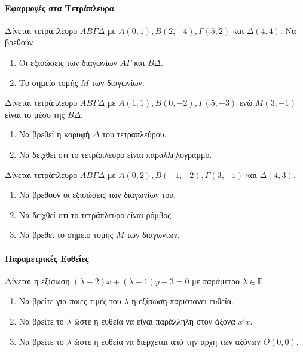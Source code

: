 \documentclass[11pt,a4paper,modern]{FFExercises}
\begin{document}
\paragraph{Εφαρμογές στα Τετράπλευρα}
\askhsh
Δίνεται τετράπλευρο $ AB\varGamma\varDelta $ με $ A(0,1), Β(2,-4), \varGamma(5,2) $ και $ \varDelta(4,4) $. Να βρεθούν 
\begin{enumerate}[itemsep=0mm,label=\alph*.]
	\item Οι εξισώσεις των διαγωνίων $ Α\varGamma $ και $ B\varDelta $.
	\item Το σημείο τομής $ M $ των διαγωνίων.
\end{enumerate}

\askhsh
Δίνεται τετράπλευρο $ AB\varGamma\varDelta $ με $ A(1,1), Β(0,-2), \varGamma(5,-3) $ ενώ $ M(3,-1) $ είναι το μέσο της $ B\varDelta $.
\begin{enumerate}[itemsep=0mm,label=\alph*.]
	\item Να βρεθεί η κορυφή $ \varDelta $ του τετραπλεύρου.
	\item Να δειχθεί οτι το τετράπλευρο είναι παραλληλόγραμμο.
\end{enumerate}

\askhsh
Δίνεται τετράπλευρο $ AB\varGamma\varDelta $ με $ A(0,2), Β(-1,-2), \varGamma(3,-1) $ και $ \varDelta(4,3) $.
\begin{enumerate}[itemsep=0mm,label=\alph*.]
	\item Να βρεθουν οι εξισώσεις των διαγωνίων του.
	\item Να δειχθεί οτι το τετράπλευρο είναι ρόμβος.
	\item Να βρεθεί το σημείο τομής $ M $ των διαγωνίων.
\end{enumerate}
\paragraph{Παραμετρικές Ευθείες}

\askhsh
Δίνεται η εξίσωση $ (\lambda-2)x + (\lambda+1)y - 3 = 0 $ με παράμετρο $ \lambda \in \mathbb{R} $.
\begin{enumerate}[itemsep=0mm,label=\alph*.]
	\item Να βρείτε για ποιες τιμές του $\lambda$ η εξίσωση παριστάνει ευθεία.
	\item Να βρείτε το $\lambda$ ώστε η ευθεία να είναι παράλληλη στον άξονα $x'x$.
	\item Να βρείτε το $\lambda$ ώστε η ευθεία να διέρχεται από την αρχή των αξόνων $ O(0,0) $.
\end{enumerate}
\end{document}
